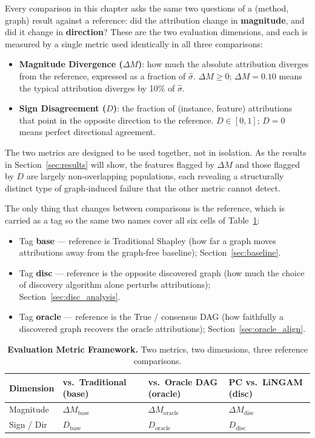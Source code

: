 \documentclass[12pt,a4paper,oneside]{article}
\begin{document}
Every comparison in this chapter asks the same two questions of a (method, graph) result against a reference: did the attribution change in \textbf{magnitude}, and did it change in \textbf{direction}? These are the two evaluation dimensions, and each is measured by a single metric used identically in all three comparisons:

\begin{itemize}[nosep]
  \item \textbf{Magnitude Divergence ($\Delta M$)}: how much the absolute attribution diverges from the reference, expressed as a fraction of $\hat{\sigma}$. $\Delta M \geq 0$; $\Delta M = 0.10$ means the typical attribution diverges by 10\% of $\hat{\sigma}$.
  \item \textbf{Sign Disagreement ($D$)}: the fraction of (instance, feature) attributions that point in the opposite direction to the reference. $D \in [0, 1]$; $D = 0$ means perfect directional agreement.
\end{itemize}

The two metrics are designed to be used together, not in isolation. As the results in Section~\ref{sec:results} will show, the features flagged by $\Delta M$ and those flagged by $D$ are largely non-overlapping populations, each revealing a structurally distinct type of graph-induced failure that the other metric cannot detect.

The only thing that changes between comparisons is the reference, which is carried as a tag so the same two names cover all six cells of Table~\ref{tab:metric_framework}:
\begin{itemize}[nosep]
  \item Tag \textbf{base} --- reference is Traditional Shapley (how far a graph moves attributions away from the graph-free baseline); Section~\ref{sec:baseline}.
  \item Tag \textbf{disc} --- reference is the opposite discovered graph (how much the choice of discovery algorithm alone perturbs attributions); Section~\ref{sec:disc_analysis}.
  \item Tag \textbf{oracle} --- reference is the True / consensus DAG (how faithfully a discovered graph recovers the oracle attributions); Section~\ref{sec:oracle_align}.
\end{itemize}

\begin{table}[H]
  \centering
  \caption{\textbf{Evaluation Metric Framework.} Two metrics, two dimensions, three reference comparisons.}
  \label{tab:metric_framework}
  \begin{tabularx}{\textwidth}{lXXX}
    \toprule
    \textbf{Dimension} & \textbf{vs.\ Traditional (base)} & \textbf{vs.\ Oracle DAG (oracle)} & \textbf{PC vs.\ LiNGAM (disc)} \\
    \midrule
    Magnitude  & $\Delta M_{\text{base}}$   & $\Delta M_{\text{oracle}}$   & $\Delta M_{\text{disc}}$   \\
    Sign / Dir & $D_{\text{base}}$          & $D_{\text{oracle}}$          & $D_{\text{disc}}$          \\
    \bottomrule
  \end{tabularx}
\end{table}
\end{document}
